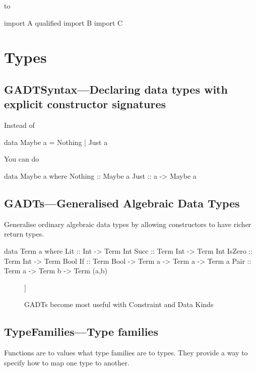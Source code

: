 \documentclass[openany, 12pt]{book}
\begin{document}
to
\begin{haskell}{}
import A qualified
import B
import C
\end{haskell}


\part{Types}


\setcounter{chapter}{7}
\chapter{GADTSyntax---Declaring data types with explicit constructor signatures}
Instead of
\begin{haskell}{}
data Maybe a = Nothing | Just a
\end{haskell}

You can do
\begin{haskell}{}
data Maybe a where
    Nothing :: Maybe a
    Just    :: a -> Maybe a
\end{haskell}

\chapter{GADTs---Generalised Algebraic Data Types}
Generalise ordinary algebraic data types by allowing constructors to have richer
return types.

\begin{haskell}{}
data Term a where
    Lit    :: Int -> Term Int
    Succ   :: Term Int -> Term Int
    IsZero :: Term Int -> Term Bool
    If     :: Term Bool -> Term a -> Term a -> Term a
    Pair   :: Term a -> Term b -> Term (a,b)
\end{haskell}

\begin{figure}[H]
	\begin{center}
		\begin{forest}
			[GADT
					[Constraint Kinds]
					[Data Kinds]
			]
		\end{forest}
	\end{center}
	\caption{GADTs become most useful with Constraint and Data Kinds}
\end{figure}


\setcounter{chapter}{9}
\chapter{TypeFamilies---Type families}
Functions are to values what type families are to types. They provide a way to
specify how to map one type to another.
\end{document}
